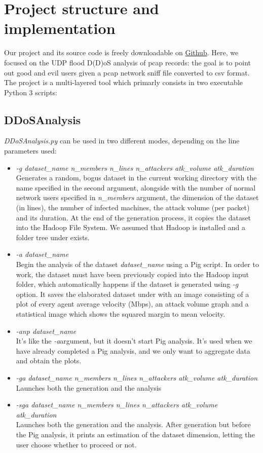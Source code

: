 \section{Project structure and implementation}
Our project and its source code is freely downloadable on \href{https://github.com/CristianTuretta/DDoS-Network-Flow-Forensics-Analyser-.git}{Github}. Here, we focused on the UDP flood D(D)oS analysis of pcap records: the goal is to point out good and evil users given a pcap network sniff file converted to csv format. The project is a multi-layered tool which primarly consists in two executable Python 3 scripts:

\subsection{DDoSAnalysis}
\textit{DDoSAnalysis.py} can be used in two different modes, depending on the line parameters used: 
	\begin{itemize}
		\item \textit{-g dataset\_name n\_members n\_lines n\_attackers atk\_volume atk\_duration} \\Generates a random, bogus dataset in the current working directory with the name specified in the second argument, alongside with the number of normal network users specified in \textit{n\_members} argument, the dimension of the dataset (in lines), the number of infected machines, the attack volume (per packet) and its duration. At the end of the generation process, it copies the dataset into the Hadoop File System. We assumed that Hadoop is installed and a folder tree under  exists.
		\item \textit{-a dataset\_name} \\ Begin the analysis of the dataset \textit{dataset\_name} using a Pig script. In order to work, the dataset must have been previously copied into the Hadoop input folder, which automatically happens if the dataset is generated using \textit{-g} option. It saves the elaborated dataset under  with an image consisting of a plot of every agent average velocity (Mbps), an attack volume graph and a statistical image which shows the squared margin to mean velocity.
		\item \textit{-anp dataset\_name} \\ It's like the \textit{-a}argument, but it doesn't start Pig analysis. It's used when we have already completed a Pig analysis, and we only want to aggregate data and obtain the plots. 
		\item \textit{-ga dataset\_name n\_members n\_lines n\_attackers atk\_volume atk\_duration} \\ Launches both the generation and the analysis
		\item \textit{-sga dataset\_name n\_members n\_lines n\_attackers atk\_volume atk\_duration} \\ Launches both the generation and the analysis. After generation but before the Pig analysis, it prints an estimation of the dataset dimension, letting the user choose whether to proceed or not.
	\end{itemize}
